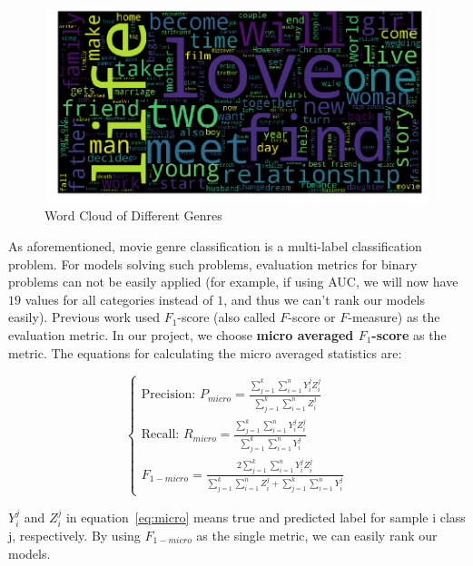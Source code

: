 \documentclass[12pt]{article} %
\begin{document}
\begin{figure}[H]
\begin{minipage}{0.5\textwidth}
\begin{minipage}{\textwidth}
  \end{minipage}
  \begin{minipage}{\textwidth}
    \centering
    \includegraphics[width=\linewidth]{wordcloud1.png}
  \end{minipage}
  \caption{Word Cloud of Different Genres}
   \label{fig:word-cloud}
\end{minipage}%
\end{figure}

As aforementioned, movie genre classification is a multi-label classification problem. For models solving such problems, evaluation metrics for binary problems can not be easily applied (for example, if using AUC, we will now have $19$ values for all categories instead of $1$, and thus we can't rank our models easily). Previous work \cite{multilabel,multilabel1,multilabel2} used $F_1$-score (also called $F$-score or $F$-measure) as the evaluation metric. In our project, we choose {\bf micro averaged $F_1$-score} \cite{multilabel} as the metric. The equations for calculating the micro averaged statistics are:

\begin{equation} \label{eq:micro}
\begin{cases}
\text{Precision: }P_{micro}=\frac{\sum_{j=1}^k\sum_{i=1}^nY_i^jZ_i^j}{\sum_{j=1}^k\sum_{i=1}^nZ_i^j}\\
\text{Recall: }R_{micro}=\frac{\sum_{j=1}^k\sum_{i=1}^nY_i^jZ_i^j}{\sum_{j=1}^k\sum_{i=1}^nY_i^j}\\
F_{1-micro} = \frac{2\sum_{j=1}^k\sum_{i=1}^nY_i^jZ_i^j}{\sum_{j=1}^k\sum_{i=1}^nZ_i^j+\sum_{j=1}^k\sum_{i=1}^nY_i^j}
\end{cases}
\end{equation}

$Y_i^j$ and $Z_i^j$ in equation~\ref{eq:micro} means true and predicted label for sample i class j, respectively. By using $F_{1-micro}$ as the single metric, we can easily rank our models.
\end{document}
